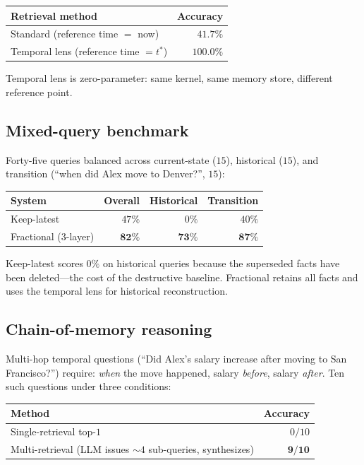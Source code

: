 \documentclass[11pt]{article}
\theoremstyle{plain}
\theoremstyle{definition}
\begin{document}
\begin{center}
\begin{tabular}{@{}lr@{}}
\toprule
Retrieval method & Accuracy \\
\midrule
Standard (reference time $=$ now) & $41.7\%$ \\
Temporal lens (reference time $= t^*$)
  & $\mathbf{100.0\%}$ \\
\bottomrule
\end{tabular}
\end{center}

Temporal lens is zero-parameter: same kernel, same
memory store, different reference point.

\subsection{Mixed-query benchmark}

Forty-five queries balanced across current-state
($15$), historical ($15$), and transition
(``when did Alex move to Denver?'', $15$):

\begin{center}
\begin{tabular}{@{}lrrr@{}}
\toprule
System & Overall & Historical & Transition \\
\midrule
Keep-latest & $47\%$ & $\phantom{0}0\%$ & $40\%$ \\
Fractional (3-layer) & $\mathbf{82\%}$
  & $\mathbf{73\%}$ & $\mathbf{87\%}$ \\
\bottomrule
\end{tabular}
\end{center}

Keep-latest scores $0\%$ on historical queries
because the superseded facts have been deleted---the
cost of the destructive baseline.  Fractional retains
all facts and uses the temporal lens for historical
reconstruction.

\subsection{Chain-of-memory reasoning}

Multi-hop temporal questions
(``Did Alex's salary increase after moving to San
Francisco?'') require: \emph{when} the move happened,
salary \emph{before}, salary \emph{after}.  Ten such
questions under three conditions:

\begin{center}
\begin{tabular}{@{}lr@{}}
\toprule
Method & Accuracy \\
\midrule
Single-retrieval top-$1$ & $\phantom{0}0/10$ \\
Multi-retrieval (LLM issues $\sim\!4$ sub-queries,
  synthesizes) & $\mathbf{9/10}$ \\
\bottomrule
\end{tabular}
\end{center}
\end{document}
